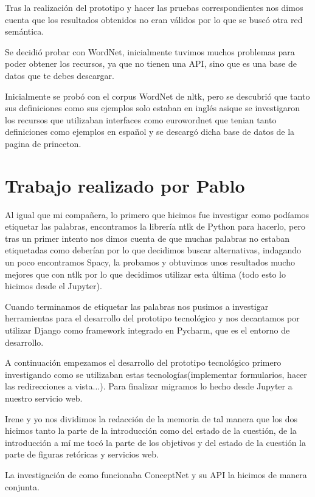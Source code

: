 Tras la realización del prototipo y hacer las pruebas correspondientes nos dimos cuenta que los resultados obtenidos no eran válidos por lo que se buscó otra red semántica.

Se decidió probar con WordNet, inicialmente tuvimos muchos problemas para poder obtener los recursos, ya que no tienen una API, sino que es una base de datos que te debes descargar.

Inicialmente se probó con el corpus WordNet de nltk, pero se descubrió que tanto sus definiciones como sus ejemplos solo estaban en inglés asique se investigaron los recursos que utilizaban interfaces como eurowordnet que tenian tanto definiciones como ejemplos en español y se descargó dicha base de datos de la pagina de princeton.


\section{Trabajo realizado por Pablo}
\label{cap:sec:trabajo_Pablo}

Al igual que mi compañera, lo primero que hicimos fue investigar como podíamos etiquetar las palabras, encontramos la librería ntlk de Python para hacerlo, pero tras un primer intento nos dimos cuenta de que muchas palabras no estaban etiquetadas como deberían por lo que decidimos buscar alternativas, indagando un poco encontramos Spacy, la probamos y obtuvimos unos resultados mucho mejores que con ntlk por lo que decidimos utilizar esta última (todo esto lo hicimos desde el Jupyter). 

Cuando terminamos de etiquetar las palabras nos pusimos a investigar herramientas para el desarrollo del prototipo tecnológico y nos decantamos por utilizar Django como framework integrado en Pycharm, que es el entorno de desarrollo.

A continuación empezamos el desarrollo del prototipo tecnológico primero investigando como se utilizaban estas tecnologías(implementar formularios, hacer las redirecciones a vista...). Para finalizar migramos lo hecho desde Jupyter a nuestro servicio web. \newline

Irene y yo nos dividimos la redacción de la memoria de tal manera que los dos hicimos tanto la parte de la introducción como del estado de la cuestión, de la introducción a mí me tocó la parte de los objetivos y del estado de la cuestión la parte de figuras retóricas y servicios web. \newline

La investigación de como funcionaba ConceptNet y su API la hicimos de manera conjunta.


